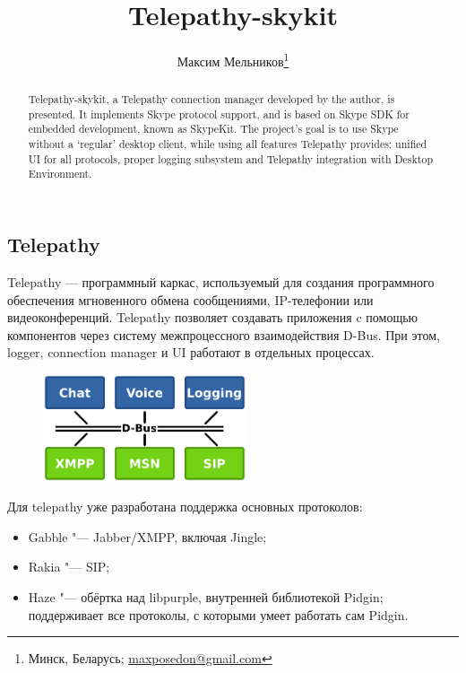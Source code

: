 \documentclass[10pt, a5paper]{article}
\begin{document}
\title{Telepathy-skykit}%

\author{Максим Мельников\footnote{Минск, Беларусь; \url{maxposedon@gmail.com}}}
\maketitle

\begin{abstract}
Telepathy-skykit, a Telepathy connection manager developed by the author, is presented. It implements Skype protocol support, and is based on Skype SDK for embedded development, known as SkypeKit. The project's goal is to use Skype without a `regular' desktop client, while using all features Telepathy provides: unified UI for all protocols, proper logging subsystem and Telepathy integration with Desktop Environment.
\end{abstract}

\subsection*{Telepathy}

Telepathy — программный каркас, используемый для создания программного обеспечения мгновенного обмена сообщениями, IP-телефонии или видеоконференций. Telepathy позволяет создавать приложения c помощью компонентов через систему межпроцессного взаимодействия D-Bus. При этом, logger, connection manager и UI работают в отдельных процессах.

\begin{figure}[t]
  \centering
  \includegraphics[width=6cm]{101_2013_w_Melnikau_tao}
\end{figure}

Для telepathy уже разработана поддержка основных протоколов:
\begin{itemize}
\item Gabble "--- Jabber/XMPP, включая Jingle;
\item Rakia "--- SIP;
\item Haze "--- обёртка над libpurple, внутренней библиотекой Pidgin; поддерживает все протоколы, с которыми умеет работать сам Pidgin.
\end{itemize}
\end{document}
